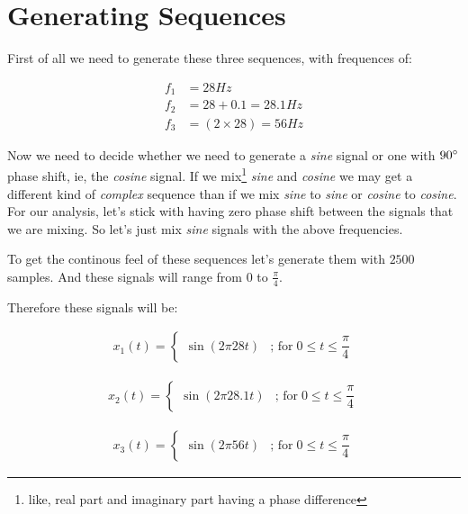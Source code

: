 \documentclass[../../course]{subfiles}
\begin{document}
\section{Generating Sequences} \label{sec:wrkGenSeqs}

First of all we need to generate these three sequences, with frequences of:

\begin{align}
    f_{1} &= 28 \si{Hz}                     \label{eqn:freq1} \\
    f_{2} &= 28 + 0.1      = 28.1   \si{Hz} \label{eqn:freq2} \\
    f_{3} &= (2 \times 28) = 56     \si{Hz} \label{eqn:freq3}
\end{align}

Now we need to decide whether we need to generate a \emph{sine} signal or one with
$90 \degree$ phase shift, ie, the \emph{cosine} signal. If we mix\footnote{like, real
part and imaginary part having a phase difference} \emph{sine} and \emph{cosine} we may
get a different kind of \emph{complex} sequence than if we mix \emph{sine} to \emph{sine}
or \emph{cosine} to \emph{cosine}. For our analysis, let's stick with having zero phase
shift between the signals that we are mixing. So let's just mix \emph{sine} signals with
the above frequencies.


To get the continous feel of these sequences let's generate them with $2500$ samples.
And these signals will range from $0$ to $\frac{\pi}{4}$.


Therefore these signals will be:

\begin{align}
    x_{1}(t) =
    \begin{cases}
        \sin(2 \pi 28 t) & \text{; for} \; 0 \le t \le \dfrac{\pi}{4}
    \end{cases}
    \label{eqn:seqx1}
\end{align}

\begin{align}
    x_{2}(t) =
    \begin{cases}
        \sin(2 \pi 28.1 t) & \text{; for} \; 0 \le t \le \dfrac{\pi}{4}
    \end{cases}
    \label{eqn:seqx2}
\end{align}

\begin{align}
    x_{3}(t) =
    \begin{cases}
        \sin(2 \pi 56 t) & \text{; for} \; 0 \le t \le \dfrac{\pi}{4}
    \end{cases}
    \label{eqn:seqx3}
\end{align}
\end{document}
